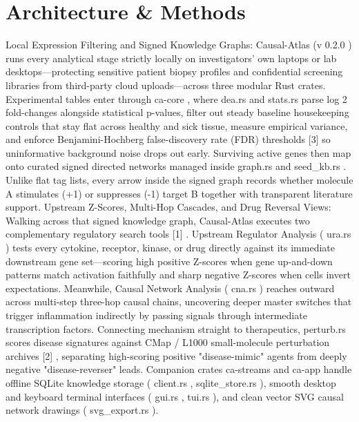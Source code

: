 \documentclass[10pt,letterpaper]{article}
\begin{document}
\section{Architecture \& Methods}
Local Expression Filtering and Signed Knowledge Graphs: Causal-Atlas (v 0.2.0 ) runs every analytical stage strictly locally on investigators' own laptops or lab desktops---protecting sensitive patient biopsy profiles and confidential screening libraries from third-party cloud uploads---across three modular Rust crates. Experimental tables enter through ca-core , where dea.rs and stats.rs parse log 2 fold-changes alongside statistical p-values, filter out steady baseline housekeeping controls that stay flat across healthy and sick tissue, measure empirical variance, and enforce Benjamini-Hochberg false-discovery rate (FDR) thresholds [3] so uninformative background noise drops out early. Surviving active genes then map onto curated signed directed networks managed inside graph.rs and seed\_kb.rs . Unlike flat tag lists, every arrow inside the signed graph records whether molecule A stimulates (+1) or suppresses (-1) target B together with transparent literature support. Upstream Z-Scores, Multi-Hop Cascades, and Drug Reversal Views: Walking across that signed knowledge graph, Causal-Atlas executes two complementary regulatory search tools [1] . Upstream Regulator Analysis ( ura.rs ) tests every cytokine, receptor, kinase, or drug directly against its immediate downstream gene set---scoring high positive Z-scores when gene up-and-down patterns match activation faithfully and sharp negative Z-scores when cells invert expectations. Meanwhile, Causal Network Analysis ( cna.rs ) reaches outward across multi-step three-hop causal chains, uncovering deeper master switches that trigger inflammation indirectly by passing signals through intermediate transcription factors. Connecting mechanism straight to therapeutics, perturb.rs scores disease signatures against CMap / L1000 small-molecule perturbation archives [2] , separating high-scoring positive "disease-mimic" agents from deeply negative "disease-reverser" leads. Companion crates ca-streams and ca-app handle offline SQLite knowledge storage ( client.rs , sqlite\_store.rs ), smooth desktop and keyboard terminal interfaces ( gui.rs , tui.rs ), and clean vector SVG causal network drawings ( svg\_export.rs ).
\end{document}
